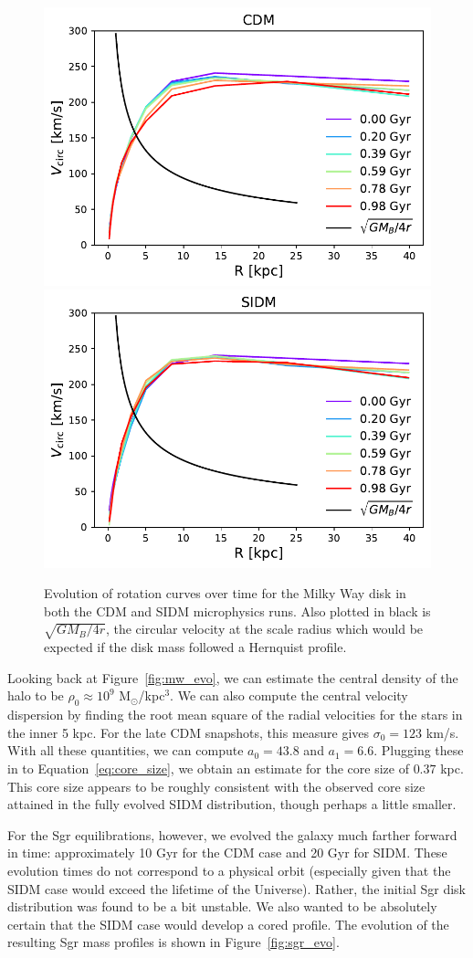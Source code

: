 \begin{figure}
    \centering 
    \includegraphics[width=0.45\linewidth]{figs/mw_cdm_rot_curve.pdf}
    \includegraphics[width=0.45\linewidth]{figs/mw_sidm_rot_curve.pdf}
    \caption{%
        Evolution of rotation curves over time for the Milky Way disk in both
        the CDM and SIDM microphysics runs. Also plotted in black is
        $\sqrt{GM_B/4r}$, the circular velocity at the scale radius which would
        be expected if the disk mass followed a Hernquist profile.
    }
    \label{fig:mw_rot_curves}
\end{figure}

Looking back at Figure~\ref{fig:mw_evo}, we can estimate the central density
of the halo to be $\rho_0 \approx 10^9$ M$_\odot$/kpc$^3$. We can also compute
the central velocity dispersion by finding the root mean square of the radial
velocities for the stars in the inner 5 kpc. For the late CDM snapshots, this
measure gives $\sigma_0 = 123$ km/s.  With all these quantities, we can
compute $a_0 = 43.8$ and $a_1 = 6.6$. Plugging these in to
Equation~\ref{eq:core_size}, we obtain an estimate for the core size of $0.37$
kpc. This core size appears to be roughly consistent with the observed core
size attained in the fully evolved SIDM distribution, though perhaps a little
smaller.

For the Sgr equilibrations, however, we evolved the galaxy much farther
forward in time: approximately 10 Gyr for the CDM case and 20 Gyr for SIDM.
These evolution times do not correspond to a physical orbit (especially given
that the SIDM case would exceed the lifetime of the Universe).  Rather, the
initial Sgr disk distribution was found to be a bit unstable.  We also wanted
to be absolutely certain that the SIDM case would develop a cored profile.
The evolution of the resulting Sgr mass profiles is shown in
Figure~\ref{fig:sgr_evo}.

